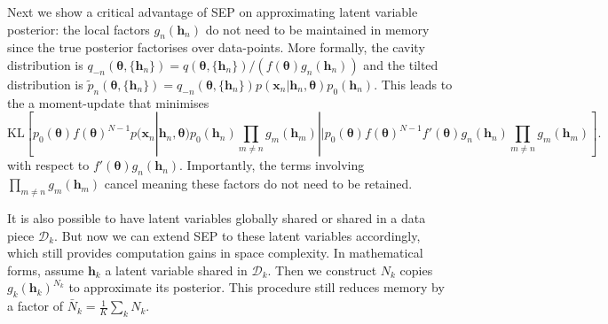 \documentclass{article} %
\begin{document}
Next we show a critical advantage of SEP on approximating latent variable posterior: the local factors $g_n(\bm{h}_n)$ do not need to be maintained in memory since the true posterior factorises over data-points. 
%
More formally, the cavity distribution is $q_{-n}(\bm{\theta}, \{ \bm{h}_n\}) = q(\bm{\theta}, \{ \bm{h}_n\})/(f(\bm{\theta}) g_n(\bm{h}_n)) $ and the tilted distribution is $\tilde{p}_n(\bm{\theta}, \{ \bm{h}_n\}) = q_{-n}(\bm{\theta}, \{ \bm{h}_n\}) p(\bm{x}_n | \bm{h}_n, \bm{\theta})p_0(\bm{h}_n)$. This leads to the a moment-update that minimises 
%
\begin{equation}
\mathrm{KL}[ p_0(\bm{\theta}) f(\bm{\theta})^{N-1} p(\bm{x}_n | \bm{h}_n, \bm{\theta})p_0(\bm{h}_n) \prod_{m\ne n} g_m(\bm{h}_m) || p_0(\bm{\theta}) f(\bm{\theta})^{N-1} f'(\bm{\theta}) g_n(\bm{h}_n) \prod_{m\ne n} g_m(\bm{h}_m)] .\nonumber
\end{equation}
%
with respect to $f'(\bm{\theta}) g_n(\bm{h}_n)$. Importantly, the terms involving $\prod_{m\ne n} g_m(\bm{h}_m)$ cancel meaning these factors do not need to be retained.

It is also possible to have latent variables globally shared or shared in a data piece $\mathcal{D}_k$. But now we can extend SEP to these latent variables accordingly, which still provides computation gains in space complexity. In mathematical forms, assume $\bm{h}_k$ a latent variable shared in $\mathcal{D}_k$. Then we construct $N_k$ copies $g_k(\bm{h}_k)^{N_k}$ to approximate its posterior. This procedure still reduces memory by a factor of $\bar{N}_k = \frac{1}{K} \sum_k N_k$.

\end{document}

